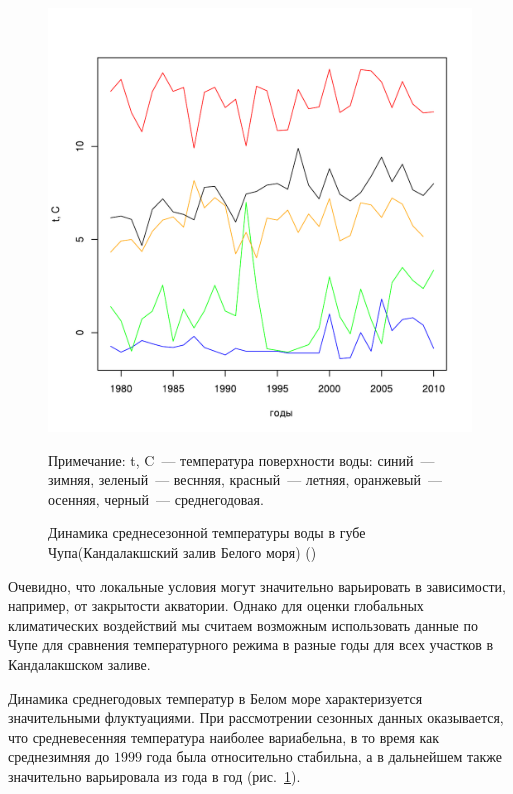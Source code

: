 	\begin{figure}[p]
    \includegraphics[width=\textwidth]{../White_Sea/temperature_Kartesh/t_mean_season_year1.pdf}
    \caption{Динамика среднесезонной температуры воды в губе Чупа(Кандалакшский залив Белого моря) (\cite{Berger_et_al_2003})}

{\footnotesize Примечание: t, C~--- температура поверхности воды: синий~--- зимняя, зеленый~--- веснняя, красный~--- летняя, оранжевый~--- осенняя, черный~--- среднегодовая. }
    \label{ris:White_temp_seasons_dynamic}
	\end{figure}

Очевидно, что локальные условия могут значительно варьировать в зависимости, например, от закрытости акватории.
Однако для оценки глобальных климатических воздействий мы считаем возможным использовать данные по Чупе для сравнения температурного режима в разные годы для всех участков в Кандалакшском заливе.

Динамика среднегодовых температур в Белом море характеризуется значительными флуктуациями.
При рассмотрении сезонных данных оказывается, что средневесенняя температура наиболее вариабельна, в то время как среднезимняя до $1999$ года была относительно стабильна, а в дальнейшем также значительно варьировала из года в год (рис.~\ref{ris:White_temp_seasons_dynamic}).


